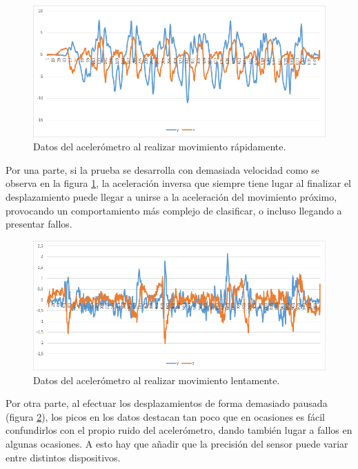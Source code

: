 \newpage

\begin{figure}[H]
	\centering
	\includegraphics[scale=0.6]{imagenes/grafico_rapido.png}
	\caption{Datos del acelerómetro al realizar movimiento rápidamente.\label{fig:acc_5}}
\end{figure}

Por una parte, si la prueba se desarrolla con demasiada velocidad como se observa en la figura \ref{fig:acc_5}, la aceleración inversa que siempre tiene lugar al finalizar el desplazamiento puede llegar a unirse a la aceleración del  movimiento próximo, provocando un comportamiento más complejo de clasificar, o incluso llegando a presentar fallos.

\begin{figure}[H]
	\centering
	\includegraphics[scale=0.6]{imagenes/grafico_lento.png}
	\caption{Datos del acelerómetro al realizar movimiento lentamente.\label{fig:acc_6}}
\end{figure}

Por otra parte, al efectuar los desplazamientos de forma demasiado pausada (figura \ref{fig:acc_6}), los picos en los datos destacan tan poco que en ocasiones es fácil confundirlos con el propio ruido del acelerómetro, dando también lugar a fallos en algunas ocasiones. A esto hay que añadir que la precisión del sensor puede variar entre distintos dispositivos.

